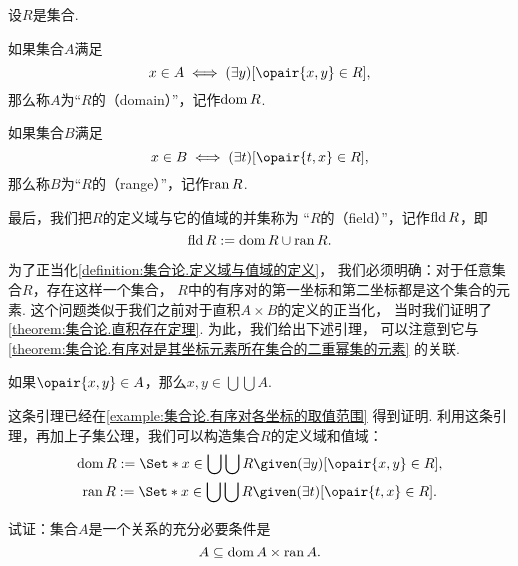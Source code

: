 \begin{definition}\label{definition:集合论.定义域与值域的定义}
设\(R\)是集合.

如果集合\(A\)满足\begin{equation*}
	x \in A \iff (\exists y)[\opair{x,y} \in R],
\end{equation*}
那么称\(A\)为“\(R\)的（domain）”，记作\(\operatorname{dom} R\).

如果集合\(B\)满足\begin{equation*}
	x \in B \iff (\exists t)[\opair{t,x} \in R],
\end{equation*}
那么称\(B\)为“\(R\)的（range）”，记作\(\operatorname{ran} R\).

最后，我们把\(R\)的定义域与它的值域的并集称为
“\(R\)的（field）”，记作\(\operatorname{fld} R\)，即\begin{equation*}
	\operatorname{fld} R := \operatorname{dom} R \cup \operatorname{ran} R.
\end{equation*}
\end{definition}

为了正当化\cref{definition:集合论.定义域与值域的定义}，
我们必须明确：对于任意集合\(R\)，存在这样一个集合，
\(R\)中的有序对的第一坐标和第二坐标都是这个集合的元素.
这个问题类似于我们之前对于直积\(A \times B\)的定义的正当化，
当时我们证明了\cref{theorem:集合论.直积存在定理}.
为此，我们给出下述引理，
可以注意到它与\cref{theorem:集合论.有序对是其坐标元素所在集合的二重幂集的元素} 的关联.

\begin{lemma}
如果\(\opair{x,y} \in A\)，那么\(x,y \in \bigcup\bigcup A\).
\end{lemma}
这条引理已经在\cref{example:集合论.有序对各坐标的取值范围} 得到证明.
利用这条引理，再加上子集公理，我们可以构造集合\(R\)的定义域和值域：
\begin{gather}
	\dom R
	\defeq
	\Set*{ x \in \bigcup\bigcup R \given (\exists y)[\opair{x,y} \in R] }, \\
	\ran R
	\defeq
	\Set*{ x \in \bigcup\bigcup R \given (\exists t)[\opair{t,x} \in R] }.
\end{gather}

\begin{example}
试证：集合\(A\)是一个关系的充分必要条件是\begin{equation*}
	A \subseteq \operatorname{dom} A \times \operatorname{ran} A.
\end{equation*}
\end{example}

